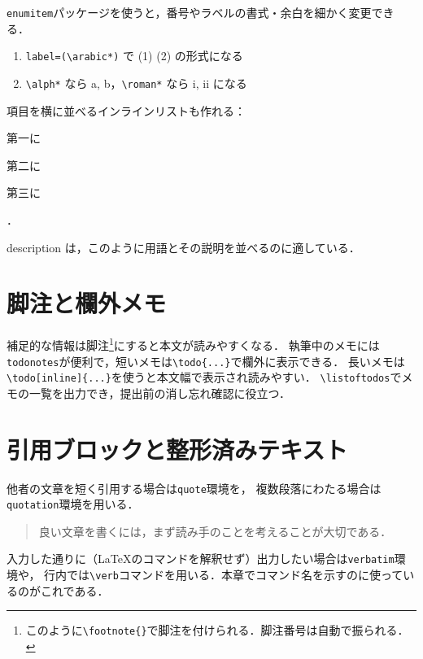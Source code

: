 \texttt{enumitem}パッケージを使うと，番号やラベルの書式・余白を細かく変更できる．

\begin{enumerate}[label=(\arabic*), leftmargin=*]
    \item \verb|label=(\arabic*)| で (1) (2) の形式になる
    \item \verb|\alph*| なら a, b，\verb|\roman*| なら i, ii になる
\end{enumerate}

項目を横に並べるインラインリストも作れる：%
\begin{enumerate*}[label=(\arabic*)]
    \item 第一に \item 第二に \item 第三に
\end{enumerate*}．

\begin{description}[leftmargin=*]
    \item[用語] description は，このように用語とその説明を並べるのに適している．
\end{description}

\section{脚注と欄外メモ}
\label{sec:footnote}
補足的な情報は脚注\footnote{このように\texttt{\textbackslash footnote\{\}}で脚注を付けられる．脚注番号は自動で振られる．}にすると本文が読みやすくなる．
執筆中のメモには\texttt{todonotes}が便利で，短いメモは\verb|\todo{...}|で欄外に表示できる．
長いメモは\verb|\todo[inline]{...}|を使うと本文幅で表示され読みやすい．
\verb|\listoftodos|でメモの一覧を出力でき，提出前の消し忘れ確認に役立つ．

\section{引用ブロックと整形済みテキスト}
\label{sec:quote}
他者の文章を短く引用する場合は\texttt{quote}環境を，
複数段落にわたる場合は\texttt{quotation}環境を用いる．

\begin{quote}
    良い文章を書くには，まず読み手のことを考えることが大切である\cite{kisaragi}．
\end{quote}

入力した通りに（\LaTeX のコマンドを解釈せず）出力したい場合は\texttt{verbatim}環境や，
行内では\verb|\verb|コマンドを用いる．本章でコマンド名を示すのに使っているのがこれである．

